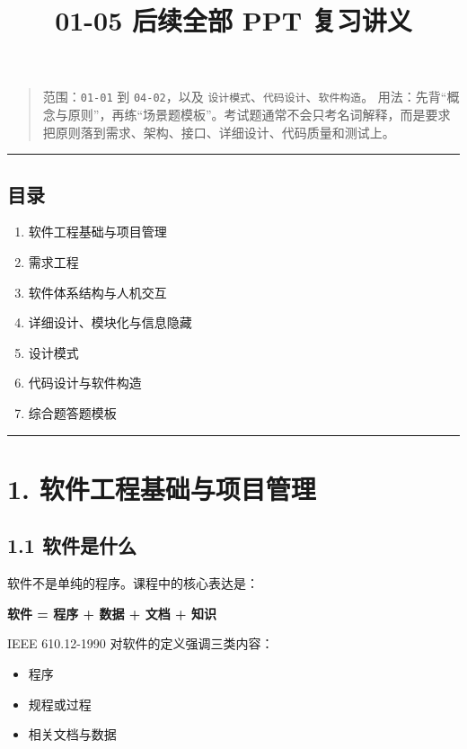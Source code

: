 \documentclass[UTF8,zihao=-4]{ctexart}
\title{01-05 后续全部 PPT 复习讲义}
\author{}
\date{}
\begin{document}
\maketitle
\tableofcontents
\newpage


\begin{quote}
范围：\texttt{01-01} 到 \texttt{04-02}，以及 \texttt{设计模式}、\texttt{代码设计}、\texttt{软件构造}。  
用法：先背“概念与原则”，再练“场景题模板”。考试题通常不会只考名词解释，而是要求把原则落到需求、架构、接口、详细设计、代码质量和测试上。
\end{quote}

\bigskip\hrule\bigskip

\subsection{目录}

\begin{enumerate}
\item 软件工程基础与项目管理
\item 需求工程
\item 软件体系结构与人机交互
\item 详细设计、模块化与信息隐藏
\item 设计模式
\item 代码设计与软件构造
\item 综合题答题模板
\end{enumerate}

\bigskip\hrule\bigskip

\section{1. 软件工程基础与项目管理}

\subsection{1.1 软件是什么}

软件不是单纯的程序。课程中的核心表达是：

\textbf{软件 = 程序 + 数据 + 文档 + 知识}

IEEE 610.12-1990 对软件的定义强调三类内容：

\begin{itemize}
\item 程序
\item 规程或过程
\item 相关文档与数据
\end{itemize}
\end{document}

